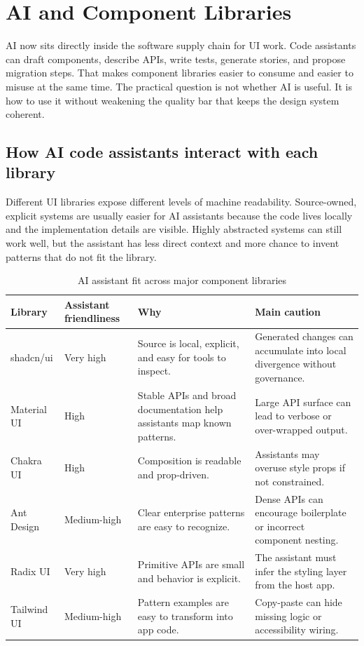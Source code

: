 \clearpage
\section{AI and Component Libraries}

AI now sits directly inside the software supply chain for UI work. Code assistants can draft components, describe APIs, write tests, generate stories, and propose migration steps. That makes component libraries easier to consume and easier to misuse at the same time. The practical question is not whether AI is useful. It is how to use it without weakening the quality bar that keeps the design system coherent.

\subsection{How AI code assistants interact with each library}
Different UI libraries expose different levels of machine readability. Source-owned, explicit systems are usually easier for AI assistants because the code lives locally and the implementation details are visible. Highly abstracted systems can still work well, but the assistant has less direct context and more chance to invent patterns that do not fit the library.

\begin{table}[htbp]
  \centering
  \caption{AI assistant fit across major component libraries}
  \begin{tabularx}{\textwidth}{@{}p{}p{}p{}Y@{}}
    \toprule
    \textbf{Library} & \textbf{Assistant friendliness} & \textbf{Why} & \textbf{Main caution} \\
    \midrule
    shadcn/ui & Very high & Source is local, explicit, and easy for tools to inspect. & Generated changes can accumulate into local divergence without governance. \\
    Material UI & High & Stable APIs and broad documentation help assistants map known patterns. & Large API surface can lead to verbose or over-wrapped output. \\
    Chakra UI & High & Composition is readable and prop-driven. & Assistants may overuse style props if not constrained. \\
    Ant Design & Medium-high & Clear enterprise patterns are easy to recognize. & Dense APIs can encourage boilerplate or incorrect component nesting. \\
    Radix UI & Very high & Primitive APIs are small and behavior is explicit. & The assistant must infer the styling layer from the host app. \\
    Tailwind UI & Medium-high & Pattern examples are easy to transform into app code. & Copy-paste can hide missing logic or accessibility wiring. \\
    \bottomrule
  \end{tabularx}
\end{table}

